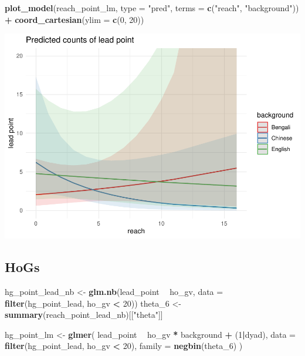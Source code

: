 \documentclass[]{article}
\newenvironment{Shaded}{\begin{snugshade}}{\end{snugshade}}
\newcommand{\DataTypeTok}[1]{\textcolor[rgb]{0.13,0.29,0.53}{#1}}
\newcommand{\DecValTok}[1]{\textcolor[rgb]{0.00,0.00,0.81}{#1}}
\newcommand{\KeywordTok}[1]{\textcolor[rgb]{0.13,0.29,0.53}{\textbf{#1}}}
\newcommand{\NormalTok}[1]{#1}
\newcommand{\OperatorTok}[1]{\textcolor[rgb]{0.81,0.36,0.00}{\textbf{#1}}}
\newcommand{\StringTok}[1]{\textcolor[rgb]{0.31,0.60,0.02}{#1}}
\begin{document}
\begin{Shaded}
\begin{Highlighting}[]
\KeywordTok{plot_model}\NormalTok{(reach_point_lm, }\DataTypeTok{type =} \StringTok{"pred"}\NormalTok{, }\DataTypeTok{terms =} \KeywordTok{c}\NormalTok{(}\StringTok{"reach"}\NormalTok{, }\StringTok{"background"}\NormalTok{)) }\OperatorTok{+}\StringTok{ }\KeywordTok{coord_cartesian}\NormalTok{(}\DataTypeTok{ylim =} \KeywordTok{c}\NormalTok{(}\DecValTok{0}\NormalTok{, }\DecValTok{20}\NormalTok{))}
\end{Highlighting}
\end{Shaded}

\includegraphics{supplement_files/figure-latex/reach-point-plot-1.pdf}

\hypertarget{hogs}{%
\subsection{HoGs}\label{hogs}}

\begin{Shaded}
\begin{Highlighting}[]
\NormalTok{hg_point_lead_nb <-}\StringTok{ }\KeywordTok{glm.nb}\NormalTok{(lead_point }\OperatorTok{~}\StringTok{ }\NormalTok{ho_gv, }\DataTypeTok{data =} \KeywordTok{filter}\NormalTok{(hg_point_lead, ho_gv }\OperatorTok{<}\StringTok{ }\DecValTok{20}\NormalTok{))}
\NormalTok{theta_}\DecValTok{6}\NormalTok{ <-}\StringTok{ }\KeywordTok{summary}\NormalTok{(reach_point_lead_nb)[[}\StringTok{"theta"}\NormalTok{]]}

\NormalTok{hg_point_lm <-}\StringTok{ }\KeywordTok{glmer}\NormalTok{(}
\NormalTok{  lead_point }\OperatorTok{~}
\StringTok{    }\NormalTok{ho_gv }\OperatorTok{*}
\StringTok{    }\NormalTok{background }\OperatorTok{+}
\StringTok{    }\NormalTok{(}\DecValTok{1}\OperatorTok{|}\NormalTok{dyad),}
  \DataTypeTok{data =} \KeywordTok{filter}\NormalTok{(hg_point_lead, ho_gv }\OperatorTok{<}\StringTok{ }\DecValTok{20}\NormalTok{),}
  \DataTypeTok{family =} \KeywordTok{negbin}\NormalTok{(theta_}\DecValTok{6}\NormalTok{)}
\NormalTok{)}
\end{Highlighting}
\end{Shaded}
\end{document}

